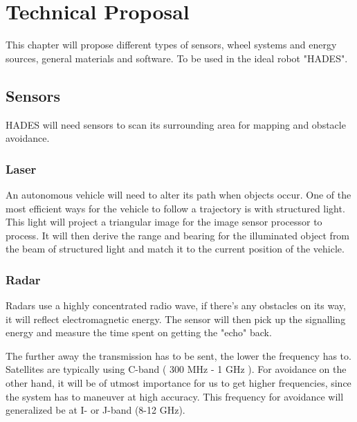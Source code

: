 \chapter{Technical Proposal}\label{ch:solutionProposal}
This chapter will propose different types of sensors, wheel systems and energy sources, general materials and software. To be used in the ideal robot "HADES".\\

\section{Sensors}
HADES will need sensors to scan its surrounding area for mapping and obstacle avoidance.

\subsection{Laser}
An autonomous vehicle will need to alter its path when objects occur. One of the most efficient ways for the vehicle to follow a trajectory is with structured light.\\This light will project a triangular image for the image sensor processor to process. It will then derive the range and bearing for the illuminated object from the beam of structured light and match it to the current position of the vehicle\cite{Lasers}.


\subsection{Radar}
Radars use a highly concentrated radio wave, if there's any obstacles on its way, it will reflect electromagnetic energy. The sensor will then pick up the signalling energy and measure the time spent on getting the "echo" back\cite{Radar}.

The further away the transmission has to be sent, the lower the frequency has to.
Satellites are typically using C-band ( 300 MHz - 1 GHz ). 
For avoidance on the other hand, it will be of utmost importance for us to get higher frequencies, since the system has to maneuver at high accuracy. This frequency for avoidance will generalized be at I- or J-band (8-12 GHz)\cite{RadarTutorial}.



